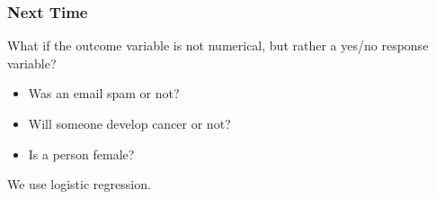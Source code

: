 \documentclass[handout]{beamer}
\newcommand{\blue}[1]{\textcolor{blue2}{#1}}
\begin{document}
\begin{frame}[fragile]
\frametitle{Next Time}

What if the outcome variable is not numerical, but rather a \blue{yes/no} response variable?

\pause \begin{itemize}
\item Was an email spam or not?
\item Will someone develop cancer or not?
\item Is a person female?
\end{itemize}

\pause We use \blue{logistic regression}.  

\end{frame}
\end{document}
